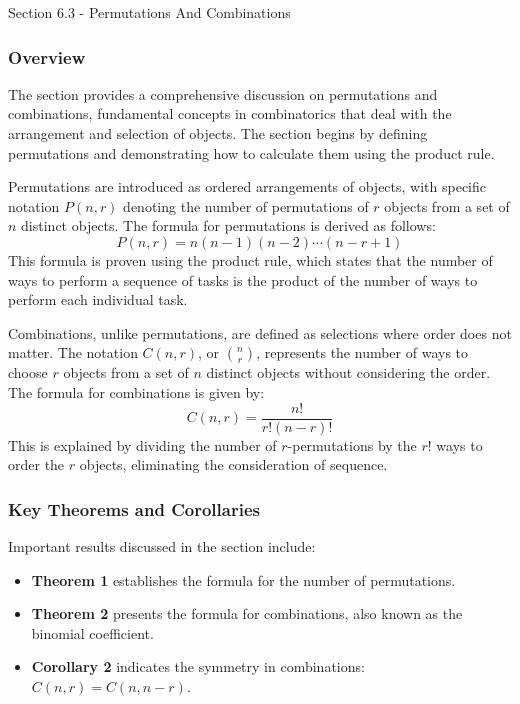 \begin{notes}{Section 6.3 - Permutations And Combinations}
    \subsubsection*{Overview}

    The section provides a comprehensive discussion on permutations and combinations, fundamental concepts in combinatorics that deal with the arrangement and selection of objects. The section begins 
    by defining permutations and demonstrating how to calculate them using the product rule. \vspace*{1em}
    
    \begin{Highlight}[Permutations]
        Permutations are introduced as ordered arrangements of objects, with specific notation $ P(n, r) $ denoting the number of permutations of $ r $ objects from a set of $ n $ distinct 
        objects. The formula for permutations is derived as follows:
        \begin{equation*}
            P(n, r) = n(n - 1)(n - 2) \cdots (n - r + 1)
        \end{equation*}
        This formula is proven using the product rule, which states that the number of ways to perform a sequence of tasks is the product of the number of ways to perform each individual task.
    \end{Highlight}

    \begin{Highlight}[Combinations]
        Combinations, unlike permutations, are defined as selections where order does not matter. The notation $ C(n, r) $, or $ \binom{n}{r} $, represents the number of ways to choose $ r $ 
        objects from a set of $ n $ distinct objects without considering the order. The formula for combinations is given by:
        \begin{equation*}
            C(n, r) = \frac{n!}{r!(n - r)!}
        \end{equation*}
        This is explained by dividing the number of $ r $-permutations by the $ r! $ ways to order the $ r $ objects, eliminating the consideration of sequence.
    \end{Highlight}
    
    \subsubsection*{Key Theorems and Corollaries}
    Important results discussed in the section include:
    \begin{itemize}
        \item \textbf{Theorem 1} establishes the formula for the number of permutations.
        \item \textbf{Theorem 2} presents the formula for combinations, also known as the binomial coefficient.
        \item \textbf{Corollary 2} indicates the symmetry in combinations: $ C(n, r) = C(n, n - r) $.
    \end{itemize}
    

\end{notes}
